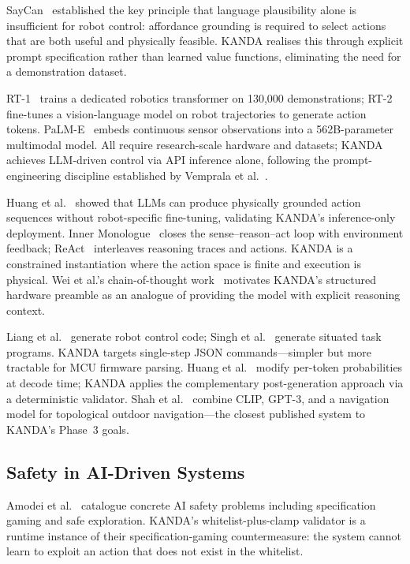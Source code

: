 \documentclass[conference]{IEEEtran}
\begin{document}
SayCan~\cite{ahn2022saycan} established the key principle that language
plausibility alone is insufficient for robot control: affordance grounding
is required to select actions that are both useful and physically feasible.
KANDA realises this through explicit prompt specification rather than learned
value functions, eliminating the need for a demonstration dataset.

RT-1~\cite{brohan2022rt1} trains a dedicated robotics transformer on 130,000
demonstrations; RT-2~\cite{brohan2023rt2} fine-tunes a vision-language model
on robot trajectories to generate action tokens.
PaLM-E~\cite{driess2023palme} embeds continuous sensor observations into a
562B-parameter multimodal model.
All require research-scale hardware and datasets; KANDA achieves LLM-driven
control via API inference alone, following the prompt-engineering discipline
established by Vemprala et al.~\cite{vemprala2024chatgpt}.

Huang et al.~\cite{huang2022zeroshot} showed that LLMs can produce
physically grounded action sequences without robot-specific fine-tuning,
validating KANDA's inference-only deployment.
Inner Monologue~\cite{huang2022innermonologue} closes the sense--reason--act
loop with environment feedback; ReAct~\cite{yao2023react} interleaves
reasoning traces and actions.
KANDA is a constrained instantiation where the action space is finite and
execution is physical.
Wei et al.'s chain-of-thought work~\cite{wei2022cot} motivates KANDA's
structured hardware preamble as an analogue of providing the model with
explicit reasoning context.

Liang et al.~\cite{liang2023code} generate robot control code;
Singh et al.~\cite{singh2023progprompt} generate situated task programs.
KANDA targets single-step JSON commands---simpler but more tractable for
MCU firmware parsing.
Huang et al.~\cite{huang2023grounded} modify per-token probabilities at
decode time; KANDA applies the complementary post-generation approach via a
deterministic validator.
Shah et al.~\cite{shah2022lmnav} combine CLIP, GPT-3, and a navigation model
for topological outdoor navigation---the closest published system to KANDA's
Phase~3 goals.

\subsection{Safety in AI-Driven Systems}

Amodei et al.~\cite{amodei2016safety} catalogue concrete AI safety problems
including specification gaming and safe exploration.
KANDA's whitelist-plus-clamp validator is a runtime instance of their
specification-gaming countermeasure: the system cannot learn to exploit an
action that does not exist in the whitelist.
\end{document}
